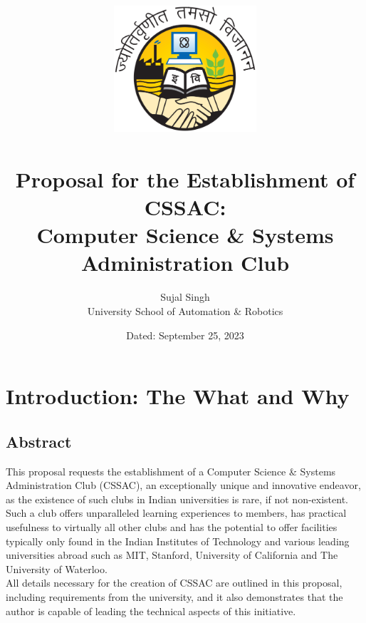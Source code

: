\documentclass[11pt,twocolumn,oneside]{book}
\title{
    \includegraphics[width=150pt]{./images/ipu}
    \\
    \textbf{\\Proposal for the Establishment of CSSAC: \\ Computer Science \& Systems Administration Club}
}
\author{Sujal Singh \\ University School of Automation \& Robotics}
\date{Dated: September 25, 2023}
\begin{document}
    \maketitle
    \tableofcontents

    \chapter{Introduction: The What and Why}\label{ch:introduction}

    \section{Abstract}\label{sec:abstract}
    This proposal requests the establishment of a Computer Science \& Systems Administration Club (CSSAC), an
    exceptionally unique and innovative endeavor, as the existence of such clubs in Indian universities is rare, if not
    non-existent.
    Such a club offers unparalleled learning experiences to members, has practical usefulness to virtually all other
    clubs and has the potential to offer facilities typically only found in the Indian Institutes of Technology and
    various leading universities abroad such as MIT, Stanford, University of California and The University of Waterloo.
    \\
    All details necessary for the creation of CSSAC are outlined in this proposal, including requirements from the
    university, and it also demonstrates that the author is capable of leading the technical aspects of this initiative.

\end{document}
